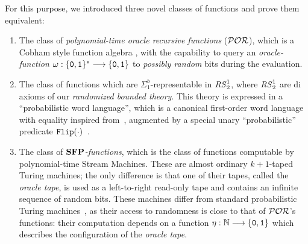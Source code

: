 For this purpose, we introduced three novel classes of functions and prove them equivalent:

\begin{enumerate}
\item The class of
\emph{polynomial-time oracle recursive functions} ($\mathcal{POR}$),
which is a Cobham style function algebra \cite{Cobham1965}, with the
capability to query an \emph{oracle-function}
$\omega: \{\mathtt{0}, \mathtt{1}\}^* \longrightarrow \{\mathtt{0}, \mathtt{1}\}$ to
\emph{possibly random} bits during the evaluation.

\item The class of functions which are
$\Sigma^b_1$-representable in ${\mathit{RS}^1_2}$,
where ${\mathit{RS}^1_2}$ are di axioms of our \emph{randomized bounded theory}.
%
This theory is expressed in a  ``probabilistic
word language'', %
%
which is a canonical first-order
word language with equality inspired from~\cite{FerreiraOitavem}, augmented
by a special unary ``probabilistic'' predicate $\mathtt{Flip}(\cdot)$~\cite{ADLP21}.
%
%
%



\item The class of \emph{$\mathbf{SFP}$-functions},
which is the class of functions computable by
polynomial-time
Stream Machines.
%
These are almost ordinary $k+1$-taped
Turing machines; the only difference is that
one of their tapes,
called the \emph{oracle tape},
is used as a left-to-right read-only tape
and contains an infinite sequence of random bits.
%
These machines differ from standard probabilistic Turing
machines~\cite{Santos69,Gill77},
as their access to randomness is close to
that of $\mathcal{POR}$'s functions: their computation depends on
a function $\eta: \mathbb{N} \longrightarrow \{\mathtt{0}, \mathtt{1}\}$ which
describes the configuration of the \emph{oracle tape}.
%

\end{enumerate}



